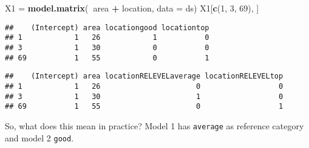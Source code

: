 \documentclass[ignorenonframetext,]{beamer}
\newenvironment{Shaded}{\begin{snugshade}}{\end{snugshade}}
\newcommand{\KeywordTok}[1]{\textcolor[rgb]{0.13,0.29,0.53}{\textbf{#1}}}
\newcommand{\DataTypeTok}[1]{\textcolor[rgb]{0.13,0.29,0.53}{#1}}
\newcommand{\DecValTok}[1]{\textcolor[rgb]{0.00,0.00,0.81}{#1}}
\newcommand{\StringTok}[1]{\textcolor[rgb]{0.31,0.60,0.02}{#1}}
\newcommand{\OperatorTok}[1]{\textcolor[rgb]{0.81,0.36,0.00}{\textbf{#1}}}
\newcommand{\NormalTok}[1]{#1}
\begin{document}
\begin{frame}[fragile]

\begin{Shaded}
\begin{Highlighting}[]
\NormalTok{X1 =}\StringTok{ }\KeywordTok{model.matrix}\NormalTok{(}\OperatorTok{~}\NormalTok{area }\OperatorTok{+}\StringTok{ }\NormalTok{location, }\DataTypeTok{data =}\NormalTok{ ds)}
\NormalTok{X1[}\KeywordTok{c}\NormalTok{(}\DecValTok{1}\NormalTok{, }\DecValTok{3}\NormalTok{, }\DecValTok{69}\NormalTok{), ]}
\end{Highlighting}
\end{Shaded}

\begin{verbatim}
##    (Intercept) area locationgood locationtop
## 1            1   26            1           0
## 3            1   30            0           0
## 69           1   55            0           1
\end{verbatim}

\begin{Shaded}
\end{Shaded}

\begin{verbatim}
##    (Intercept) area locationRELEVELaverage locationRELEVELtop
## 1            1   26                      0                  0
## 3            1   30                      1                  0
## 69           1   55                      0                  1
\end{verbatim}

So, what does this mean in practice? Model 1 has \texttt{average} as
reference category and model 2 \texttt{good}.

\end{frame}
\end{document}
